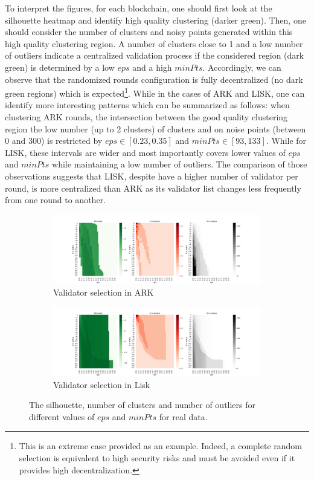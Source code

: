 \documentclass{article}
\begin{document}
To interpret the figures, for each blockchain, one should first look at the silhouette heatmap and identify high quality clustering (darker green). Then, one should consider the number of clusters and noisy points generated within this high quality clustering region. A number of clusters close to 1 and a low number of  outliers indicate a centralized validation process if the considered region (dark green) is determined by a low $eps$ and a high $minPts$. Accordingly, we can observe that the randomized rounds configuration is fully decentralized (no dark green regions) which is expected\footnote{This is an extreme case provided as an example. Indeed, a complete random selection is equivalent to high security risks and must be avoided even if it provides high decentralization.}. While in the cases of ARK and LISK, one can identify more interesting patterns which can be summarized as follows: when clustering ARK rounds, the intersection between the good quality clustering region the low number (up to 2 clusters) of clusters and on noise points (between 0 and 300) is restricted by $eps \in [0.23, 0.35]$ and $minPts \in [93, 133]$. While for LISK, these intervals are wider and most importantly covers lower values of $eps$ and $minPts$ while maintaining a low number of outliers. The comparison of those observations suggests that LISK, despite have a higher number of validator per round, is more centralized than ARK as its validator list changes less frequently from one round to another.

\begin{figure}
     \centering
     \begin{subfigure}[b]{\textwidth}
         \centering
         \includegraphics[width=\textwidth]{figures/RealN.png}
         \caption{Validator selection in ARK}
         \label{fig:DBARK}
     \end{subfigure}
     \hfill
     \begin{subfigure}[b]{\textwidth}
         \centering
         \includegraphics[width=\textwidth]{figures/LISK1dayNameN.png}
         \caption{Validator selection in Lisk}
         \label{fig:DBLISK}
     \end{subfigure}
    \caption{The silhouette, number of clusters and number of outliers for different values of $eps$ and $minPts$ for real data.}
        \label{fig:db}
\end{figure}
\end{document}
